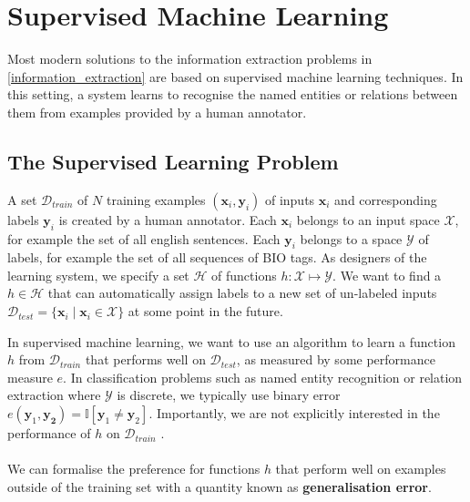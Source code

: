 \section{Supervised Machine Learning}
\label{supervised_machine_learning}

Most modern solutions to the information extraction problems in \ref{information_extraction} are based on supervised machine learning techniques. In this setting, a system learns to recognise the named entities or relations between them from examples provided by a human annotator.

\subsection{The Supervised Learning Problem}
\label{the_supervised_learning_problem}
A set $\mathcal{D}_{train}$ of $N$ training examples $(\mathbf{x}_i, \mathbf{y}_i)$ of inputs $\mathbf{x}_i$ and corresponding labels $\mathbf{y}_i$ is created by a human annotator. Each $\mathbf{x}_i$ belongs to an input space $\mathcal{X}$, for example the set of all english sentences. Each $\mathbf{y}_i$ belongs to a space $\mathcal{Y}$ of labels, for example the set of all sequences of BIO tags. As designers of the learning system, we specify a set $\mathcal{H}$ of functions $h: \mathcal{X} \mapsto \mathcal{Y}$. We want to find a $h \in \mathcal{H}$ that can automatically assign labels to a new set of un-labeled inputs $\mathcal{D}_{test} = \{ \mathbf{x}_i \mid \mathbf{x}_i \in \mathcal{X}\}$ at some point in the future. 

In supervised machine learning, we want to use an algorithm to learn a function $h$ from $\mathcal{D}_{train}$ that performs well on $\mathcal{D}_{test}$, as measured by some performance measure $e$. In classification problems such as named entity recognition or relation extraction where $\mathcal{Y}$ is discrete, we typically use binary error $e(\mathbf{y}_1, \mathbf{y_2}) = \mathbb{I}[\mathbf{y}_1 \neq \mathbf{y}_2]$. Importantly, we are not explicitly interested in the performance of $h$ on $\mathcal{D}_{train}$ \citep{yaser12}.
\\\\
We can formalise the preference for functions $h$ that perform well on examples outside of the training set with a quantity known as \textbf{generalisation error}.

